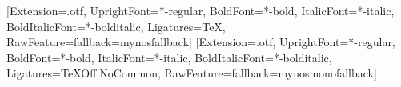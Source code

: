 \setmainfont{texgyretermes}[Extension=.otf, UprightFont=*-regular,
  BoldFont=*-bold, ItalicFont=*-italic, BoldItalicFont=*-bolditalic,
  Ligatures=TeX, RawFeature={fallback=mynosfallback}]
\setmonofont{texgyrecursor}[Extension=.otf, UprightFont=*-regular,
  BoldFont=*-bold, ItalicFont=*-italic, BoldItalicFont=*-bolditalic,
  Ligatures={TeXOff,NoCommon}, RawFeature={fallback=mynosmonofallback}]
\newcommand\mynosalign{\justifying}
\newcommand\mynosfontsline{Set in TeX Gyre Termes and TeX Gyre Cursor with LuaLaTeX.}
\setlength\emergencystretch{5em}
